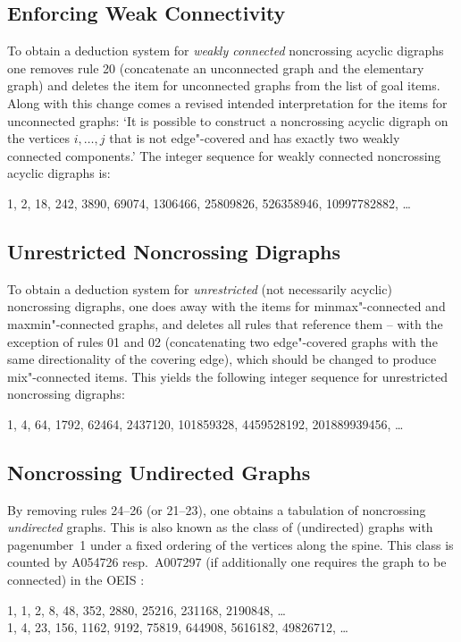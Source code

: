 \documentclass[a4paper]{article}
\begin{document}
\subsection{Enforcing Weak Connectivity}

To obtain a deduction system for \emph{weakly connected} noncrossing
acyclic digraphs one removes rule 20 (concatenate an unconnected graph
and the elementary graph) and deletes the item for unconnected graphs
from the list of goal items.
Along with this change comes a revised intended interpretation for the
items for unconnected graphs: `It is possible to construct a
noncrossing acyclic digraph on the vertices $i, \dots, j$ that is not
edge"-covered and has exactly two weakly connected components.'
The integer sequence for weakly connected noncrossing acyclic digraphs
is:
\begin{flushleft}
  1, 2, 18, 242, 3890, 69074, 1306466, 25809826, 526358946, 10997782882, \dots
\end{flushleft}

\subsection{Unrestricted Noncrossing Digraphs}

To obtain a deduction system for \emph{unrestricted} (not necessarily
acyclic) noncrossing digraphs, one does away with the items for
minmax"-connected and maxmin"-connected graphs, and deletes all rules
that reference them -- with the exception of rules 01 and 02
(concatenating two edge"-covered graphs with the same directionality
of the covering edge), which should be changed to produce
mix"-connected items.
This yields the following integer sequence for unrestricted
noncrossing digraphs:
\begin{flushleft}
  1, 4, 64, 1792, 62464, 2437120, 101859328, 4459528192, 201889939456, \dots
\end{flushleft}

\subsection{Noncrossing Undirected Graphs}

By removing rules 24--26 (or 21--23), one obtains a tabulation of
noncrossing \emph{undirected} graphs.
This is also known as the class of (undirected) graphs with
pagenumber~1 under a fixed ordering of the vertices along the spine.
This class is counted by A054726 resp.\ A007297 (if additionally one
requires the graph to be connected) in the OEIS \citep{oeis}:
\begin{flushleft}
  1, 1, 2, 8, 48, 352, 2880, 25216, 231168, 2190848, \dots\\
  1, 4, 23, 156, 1162, 9192, 75819, 644908, 5616182, 49826712, \dots
\end{flushleft}
\end{document}
